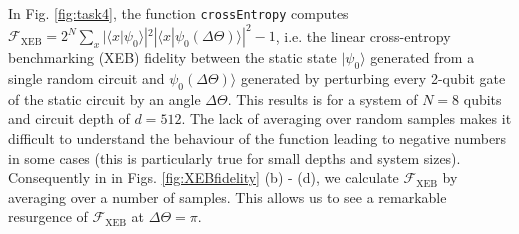\documentclass[12pt]{article}
\begin{document}
In Fig. \ref{fig:task4}, the function \texttt{crossEntropy} computes $\mathcal{F}_\mathrm{XEB} = 2^N \sum_{x} |\langle x|\psi_0\rangle|^2 |\langle x|\psi_0(\Delta\Theta) \rangle|^2 - 1$, i.e. the linear cross-entropy benchmarking (XEB) fidelity between the static state $|\psi_0\rangle$ generated from a single random circuit and $\psi_0(\Delta \Theta)\rangle$ generated by perturbing every 2-qubit gate of the static circuit by an angle $\Delta \Theta$. This results is for a system of $N = 8$ qubits and circuit depth of $d = 512$. The lack of averaging over random samples makes it difficult to understand the behaviour of the function leading to negative numbers in some cases (this is particularly true for small depths and system sizes). Consequently in in Figs. \ref{fig:XEBfidelity} (b) - (d), we calculate $\mathcal{F}_\mathrm{XEB}$ by averaging over a number of samples. This allows us to see a remarkable resurgence of $\mathcal{F}_\mathrm{XEB}$ at $\Delta \Theta = \pi$.
\end{document}
